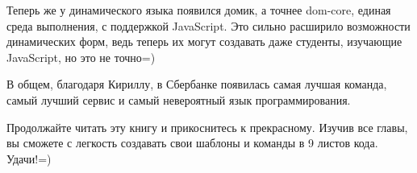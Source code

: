 \documentclass[../index.tex]{subfiles}
\begin{document}
Теперь же  у динамического языка  появился домик, а точнее dom-core, единая среда выполнения, с поддержкой JavaScript. Это сильно расширило возможности динамических форм, ведь теперь их могут создавать даже студенты, изучающие JavaScript, но это не точно=) 

В общем, благодаря Кириллу, в Сбербанке появилась самая лучшая команда, самый лучший сервис и самый невероятный язык программирования.

Продолжайте читать эту книгу и прикоснитесь к прекрасному. Изучив все главы, вы сможете с легкость создавать свои шаблоны и команды в 9 листов кода. Удачи!=)
\end{document}
